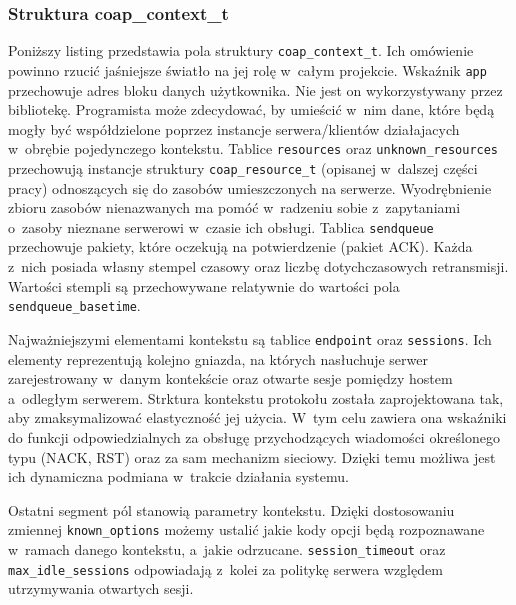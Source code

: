 
\subsubsection{Struktura coap\_context\_t}

Poniższy listing przedstawia pola struktury \verb|coap_context_t|. Ich omówienie powinno rzucić jaśniejsze światło na jej rolę w~całym projekcie. Wskaźnik \verb|app| przechowuje adres bloku danych użytkownika. Nie jest on wykorzystywany przez bibliotekę. Programista może zdecydować, by umieścić w~nim dane, które będą mogły być współdzielone poprzez instancje serwera/klientów działajacych w~obrębie pojedynczego kontekstu. Tablice \verb|resources| oraz \verb|unknown_resources| przechowują instancje struktury \verb|coap_resource_t| (opisanej w~dalszej części pracy) odnoszących się do zasobów umieszczonych na serwerze. Wyodrębnienie zbioru zasobów nienazwanych ma pomóć w~radzeniu sobie z~zapytaniami o~zasoby nieznane serwerowi w~czasie ich obsługi. Tablica \verb|sendqueue| przechowuje pakiety, które oczekują na potwierdzenie (pakiet ACK). Każda z~nich posiada własny stempel czasowy oraz liczbę dotychczasowych retransmisji. Wartości stempli są przechowywane relatywnie do wartości pola \verb|sendqueue_basetime|.

Najważniejszymi elementami kontekstu są tablice \verb|endpoint| oraz \verb|sessions|. Ich elementy reprezentują kolejno gniazda, na których nasłuchuje serwer zarejestrowany w~danym kontekście oraz otwarte sesje pomiędzy hostem a~odległym serwerem. Strktura kontekstu protokołu została zaprojektowana tak, aby zmaksymalizować elastyczność jej użycia. W~tym celu zawiera ona wskaźniki do funkcji odpowiedzialnych za obsługę przychodzących wiadomości określonego typu (NACK, RST) oraz za sam mechanizm sieciowy. Dzięki temu możliwa jest ich dynamiczna podmiana w~trakcie działania systemu.

Ostatni segment pól stanowią parametry kontekstu. Dzięki dostosowaniu zmiennej \verb|known_options| możemy ustalić jakie kody opcji będą rozpoznawane w~ramach danego kontekstu, a~jakie odrzucane. \verb|session_timeout| oraz \verb|max_idle_sessions| odpowiadają z~kolei za politykę serwera względem utrzymywania otwartych sesji.

\vspace{0.5cm}

\vspace{0.5cm}


